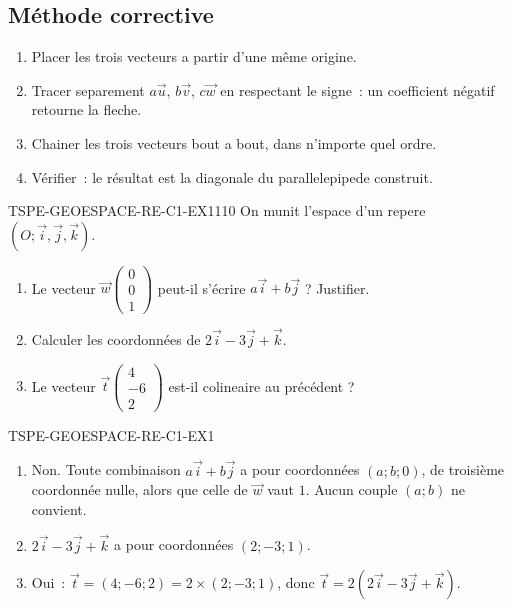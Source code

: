 \subsection*{Méthode corrective}

\begin{enumerate}
  \item Placer les trois vecteurs a partir d'une même origine.
  \item Tracer separement $a\vec{u}$, $b\vec{v}$, $c\vec{w}$ en respectant le
        signe~: un coefficient négatif retourne la fleche.
  \item Chainer les trois vecteurs bout a bout, dans n'importe quel ordre.
  \item Vérifier~: le résultat est la diagonale du parallelepipede construit.
\end{enumerate}


\begin{exercice}{TSPE-GEOESPACE-RE-C1-EX1}{1}{10}
On munit l'espace d'un repere $(O;\vec{i},\vec{j},\vec{k})$.
\begin{enumerate}
  \item Le vecteur $\vec{w}\begin{pmatrix}0\\0\\1\end{pmatrix}$ peut-il
        s'écrire $a\vec{i}+b\vec{j}$ ? Justifier.
  \item Calculer les coordonnées de $2\vec{i}-3\vec{j}+\vec{k}$.
  \item Le vecteur $\vec{t}\begin{pmatrix}4\\-6\\2\end{pmatrix}$ est-il
        colineaire au précédent ?
\end{enumerate}
\end{exercice}


\begin{corrige}{TSPE-GEOESPACE-RE-C1-EX1}
\begin{enumerate}
  \item Non. Toute combinaison $a\vec{i}+b\vec{j}$ a pour coordonnées
        $(a;b;0)$, de troisième coordonnée nulle, alors que celle de $\vec{w}$
        vaut $1$. Aucun couple $(a;b)$ ne convient.
  \item $2\vec{i}-3\vec{j}+\vec{k}$ a pour coordonnées $(2;-3;1)$.
  \item Oui~: $\vec{t}=(4;-6;2)=2\times(2;-3;1)$, donc $\vec{t}=2(2\vec{i}-3\vec{j}+\vec{k})$.
\end{enumerate}
\end{corrige}
